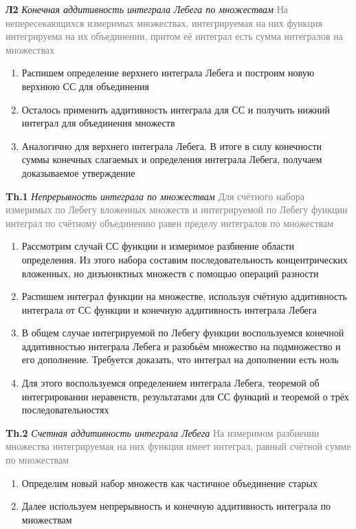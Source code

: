 \textbf{Л2} \textit{Конечная аддитивность интеграла Лебега по множествам} \textcolor{gray}{На непересекающихся
измеримых множествах, интегрируемая на них функция интегрируема на их объединении, притом её интеграл есть сумма
интегралов на множествах}

\begin{enumerate}
    \item Распишем определение верхнего интеграла Лебега и построим новую верхнюю СС для объединения
    \item Осталось применить аддитивность интеграла для СС и получить нижний интеграл для объединения множеств
    \item Аналогично для верхнего интеграла Лебега.
    В итоге в силу конечности суммы конечных слагаемых и определения интеграла Лебега, получаем доказываемое утверждение
\end{enumerate}

\textbf{Th.1} \textit{Непрерывность интеграла по множествам} \textcolor{gray}{Для счётного набора измеримых по
Лебегу вложенных множеств и интегрируемой по Лебегу функции интеграл по счётному объединению равен пределу
интегралов по множествам}

\begin{enumerate}
    \item Рассмотрим случай СС функции и измеримое разбиение области определения.
    Из этого набора составим последовательность концентрических вложенных, но дизъюнктных множеств с помощью
    операций разности
    \item Распишем интеграл функции на множестве, используя счётную аддитивность интеграла от СС функции и конечную
    аддитивность интеграла Лебега
    \item В общем случае интегрируемой по Лебегу функции воспользуемся конечной аддитивностью интеграла Лебега и
    разобьём множество на подмножество и его дополнение.
    Требуется доказать, что интеграл на дополнении есть ноль
    \item Для этого воспользуемся определением интеграла Лебега, теоремой об интегрировании неравенств,
    результатами для СС функций и теоремой о трёх последовательностях
\end{enumerate}

\textbf{Th.2} \textit{Счетная аддитивность интеграла Лебега} \textcolor{gray}{На измеримом разбиении
множества интегрируемая на них функция имеет интеграл, равный счётной сумме по множествам}

\begin{enumerate}
    \item Определим новый набор множеств как частичное объединение старых
    \item Далее используем непрерывность и конечную аддитивность интеграла по множествам
\end{enumerate}